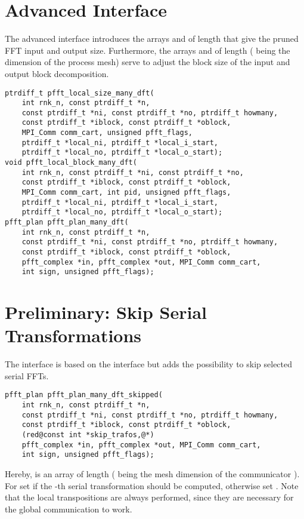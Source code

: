 \section{Advanced Interface}
The advanced interface introduces the arrays  and  of length 
that give the pruned FFT input and output size.
Furthermore, the arrays  and  of length  ( being the dimension of the process mesh)
serve to adjust the block size of the input and output block decomposition.
\begin{lstlisting}
ptrdiff_t pfft_local_size_many_dft(
    int rnk_n, const ptrdiff_t *n,
    const ptrdiff_t *ni, const ptrdiff_t *no, ptrdiff_t howmany,
    const ptrdiff_t *iblock, const ptrdiff_t *oblock,
    MPI_Comm comm_cart, unsigned pfft_flags,
    ptrdiff_t *local_ni, ptrdiff_t *local_i_start,
    ptrdiff_t *local_no, ptrdiff_t *local_o_start);
void pfft_local_block_many_dft(
    int rnk_n, const ptrdiff_t *ni, const ptrdiff_t *no,
    const ptrdiff_t *iblock, const ptrdiff_t *oblock,
    MPI_Comm comm_cart, int pid, unsigned pfft_flags,
    ptrdiff_t *local_ni, ptrdiff_t *local_i_start,
    ptrdiff_t *local_no, ptrdiff_t *local_o_start);
pfft_plan pfft_plan_many_dft(
    int rnk_n, const ptrdiff_t *n,
    const ptrdiff_t *ni, const ptrdiff_t *no, ptrdiff_t howmany,
    const ptrdiff_t *iblock, const ptrdiff_t *oblock,
    pfft_complex *in, pfft_complex *out, MPI_Comm comm_cart,
    int sign, unsigned pfft_flags);
\end{lstlisting}


\section{Preliminary: Skip Serial Transformations}
The  interface is based on the  interface but adds the possibility to skip selected serial FFTs.
\begin{lstlisting}
pfft_plan pfft_plan_many_dft_skipped(
    int rnk_n, const ptrdiff_t *n,
    const ptrdiff_t *ni, const ptrdiff_t *no, ptrdiff_t howmany,
    const ptrdiff_t *iblock, const ptrdiff_t *oblock,
    (red@const int *skip_trafos,@*)
    pfft_complex *in, pfft_complex *out, MPI_Comm comm_cart,
    int sign, unsigned pfft_flags);
\end{lstlisting}
Hereby,  is an  array of length  ( being the mesh dimension of the communicator ).
For  set  if the -th serial transformation should be computed, otherwise set .
Note that the local transpositions are always performed, since they are necessary for the global communication to work.
